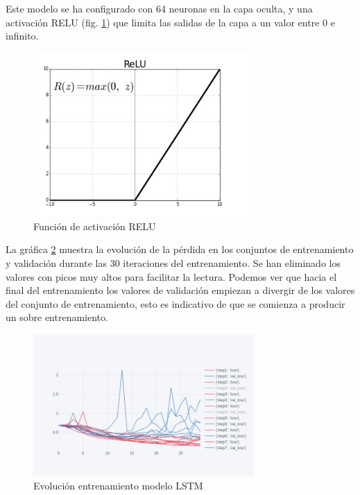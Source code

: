 Este modelo se ha configurado con 64 neuronas en la capa oculta, y una activación RELU (fig. \ref{relu}) que limita las salidas de la capa a un valor entre 0 e infinito.

\begin{figure}[!ht]
	\centering
	\includegraphics[width=0.75\textwidth]{imaxes/relu.jpg}
	\caption{Función de activación RELU}
	\label{relu}
\end{figure}

La gráfica \ref{evo_lstm_base} muestra la evolución de la pérdida en los conjuntos de entrenamiento y validación durante las 30 iteraciones del entrenamiento. Se han eliminado los valores con picos muy altos para facilitar la lectura.
Podemos ver que hacia el final del entrenamiento los valores de validación empiezan a divergir de los valores del conjunto de entrenamiento, esto es indicativo de que se comienza a producir un sobre entrenamiento.

\begin{figure}[H]
	\centering
	\includegraphics[width=0.75\textwidth]{imaxes/baselstm.png}
	\caption{Evolución entrenamiento modelo LSTM}
	\label{evo_lstm_base}
\end{figure}


